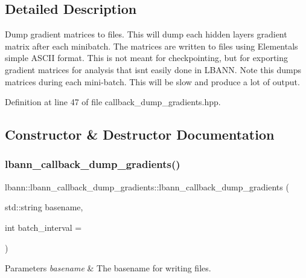 \subsection{Detailed Description}
Dump gradient matrices to files. This will dump each hidden layer\textquotesingle{}s gradient matrix after each minibatch. The matrices are written to files using Elemental\textquotesingle{}s simple A\+S\+C\+II format. This is not meant for checkpointing, but for exporting gradient matrices for analysis that isn\textquotesingle{}t easily done in L\+B\+A\+NN. Note this dumps matrices during each mini-\/batch. This will be slow and produce a lot of output. 

Definition at line 47 of file callback\+\_\+dump\+\_\+gradients.\+hpp.



\subsection{Constructor \& Destructor Documentation}
\mbox{\label{classlbann_1_1lbann__callback__dump__gradients_a321a8f673578f3a0535b9f8e27e3517a}} 
\subsubsection{\texorpdfstring{lbann\+\_\+callback\+\_\+dump\+\_\+gradients()}{lbann\_callback\_dump\_gradients()}\hspace{0.1cm}{\footnotesize\ttfamily [1/2]}}
{\footnotesize\ttfamily lbann\+::lbann\+\_\+callback\+\_\+dump\+\_\+gradients\+::lbann\+\_\+callback\+\_\+dump\+\_\+gradients (\begin{DoxyParamCaption}\item[{std\+::string}]{basename,  }\item[{int}]{batch\+\_\+interval = {} }\end{DoxyParamCaption})\hspace{0.3cm}{\ttfamily [inline]}}


\begin{DoxyParams}{Parameters}
{\em basename} & The basename for writing files. \\
\hline
\end{DoxyParams}


